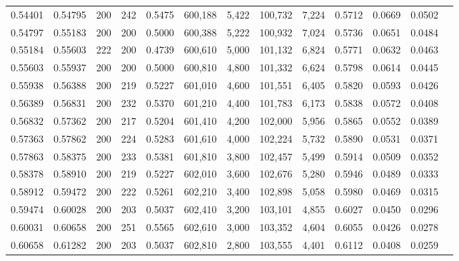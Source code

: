 \begin{tabular}{rrrrrrrrrrrrr}
0.54401 & 0.54795 &    200 & 242 &                                     0.5475 & 600,188 &   5,422 & 100,732 &   7,224 & 0.5712 & 0.0669 & 0.0502 \\
0.54797 & 0.55183 &    200 & 200 &                                     0.5000 & 600,388 &   5,222 & 100,932 &   7,024 & 0.5736 & 0.0651 & 0.0484 \\
0.55184 & 0.55603 &    222 & 200 &                                     0.4739 & 600,610 &   5,000 & 101,132 &   6,824 & 0.5771 & 0.0632 & 0.0463 \\
0.55603 & 0.55937 &    200 & 200 &                                     0.5000 & 600,810 &   4,800 & 101,332 &   6,624 & 0.5798 & 0.0614 & 0.0445 \\
0.55938 & 0.56388 &    200 & 219 &                                     0.5227 & 601,010 &   4,600 & 101,551 &   6,405 & 0.5820 & 0.0593 & 0.0426 \\
0.56389 & 0.56831 &    200 & 232 &                                     0.5370 & 601,210 &   4,400 & 101,783 &   6,173 & 0.5838 & 0.0572 & 0.0408 \\
0.56832 & 0.57362 &    200 & 217 &                                     0.5204 & 601,410 &   4,200 & 102,000 &   5,956 & 0.5865 & 0.0552 & 0.0389 \\
0.57363 & 0.57862 &    200 & 224 &                                     0.5283 & 601,610 &   4,000 & 102,224 &   5,732 & 0.5890 & 0.0531 & 0.0371 \\
0.57863 & 0.58375 &    200 & 233 &                                     0.5381 & 601,810 &   3,800 & 102,457 &   5,499 & 0.5914 & 0.0509 & 0.0352 \\
0.58378 & 0.58910 &    200 & 219 &                                     0.5227 & 602,010 &   3,600 & 102,676 &   5,280 & 0.5946 & 0.0489 & 0.0333 \\
0.58912 & 0.59472 &    200 & 222 &                                     0.5261 & 602,210 &   3,400 & 102,898 &   5,058 & 0.5980 & 0.0469 & 0.0315 \\
0.59474 & 0.60028 &    200 & 203 &                                     0.5037 & 602,410 &   3,200 & 103,101 &   4,855 & 0.6027 & 0.0450 & 0.0296 \\
0.60031 & 0.60658 &    200 & 251 &                                     0.5565 & 602,610 &   3,000 & 103,352 &   4,604 & 0.6055 & 0.0426 & 0.0278 \\
0.60658 & 0.61282 &    200 & 203 &                                     0.5037 & 602,810 &   2,800 & 103,555 &   4,401 & 0.6112 & 0.0408 & 0.0259 \\

\end{tabular}

